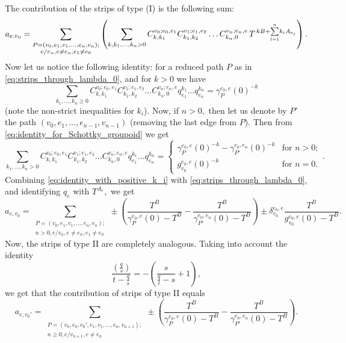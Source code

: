\documentclass[11pt,leqno]{amsart}
\numberwithin{equation}{section}
\begin{document}
The contribution of the strips of type (I) is the following sum:
\begin{equation}\label{eq:strips_through_lambda_0}a_{e,v_0}=\sum\limits_{\substack{P=(v_0,e_1,v_1,\dots,e_n,v_n);\\
e/v_n,e\ne e_n,e_1\ne e_0}}\left(\sum\limits_{k,k_1,\dots,k_n>0}C^{v_0;e_0,e_1}_{k,k_1}C^{v_1;e_1,e_2}_{k_1,k_2}\dots C^{v_n;e_n,e}_{k_n,0}\,T^{\,kB+\smash{\sum\limits_{l=1}^n} k_i A_{e_i}}\right).\end{equation}
Now let us notice the following identity: for a reduced path $P$ as in \eqref{eq:strips_through_lambda_0}, and for $k>0$ we have
\begin{equation}\label{eq:identity_for_Schottky_groupoid}
\sum\limits_{k_1,\dots,k_n\geq 0}C^{v_0;e_0,e_1}_{k,k_1}C^{v_1;e_1,e_2}_{k_1,k_2}\dots C^{v_n;e_n,e}_{k_n,0}q_{e_1}^{k_1}\dots q_{e_n}^{k_n}=\gamma_P^{e_0,e}(0)^{-k}
\end{equation}
(note the non-strict inequalities for $k_i$).
Now, if $n>0,$ then let us denote by $P'$ the path $(v_0,e_1,\dots,e_{n-1},v_{n-1})$ (removing the last edge from $P$). Then from \eqref{eq:identity_for_Schottky_groupoid} we get
\begin{equation}\label{eq:identity_with_positive_k_i}
\sum\limits_{k_1,\dots,k_n>0}C^{v_0;e_0,e_1}_{k,k_1}C^{v_1;e_1,e_2}_{k_1,k_2}\dots C^{v_n;e_n,e}_{k_n,0}q_{e_1}^{k_1}\dots q_{e_n}^{k_n}=\begin{cases}\gamma_P^{e_0,e}(0)^{-k}-\gamma_{P'}^{e_0,e_{n}}(0)^{-k} & \text{for }n>0;\\
g_{v_0}^{e_0,e}(0)^{-k} & \text{for }n=0.\end{cases}.
\end{equation} 
Combining \eqref{eq:identity_with_positive_k_i} with \eqref{eq:strips_through_lambda_0}, and identifying $q_{e}$
 with $T^{A_{e}},$ we get
\begin{equation}\label{eq:strips_through_lambda_0_final}a_{e,v_0}=\sum\limits_{\substack{P=(v_0,e_1,v_1,\dots,e_n,v_n);\\
n>0,e/v_n,e\ne e_n,e_1\ne e_0}}\pm\left(\frac{T^B}{\gamma_P^{e_0,e}(0)-T^B}-\frac{T^B}{\gamma_{P'}^{e_0,e_n}(0)-T^B}\right)\pm\delta_{v_0}^{e_0,e}\frac{T^B}{g_{v_0}^{e_0,e}(0)-T^B}.\end{equation}
Now, the strips of type II are completely analogous. Taking into account the identity $$\frac{(\frac{q}{s})}{t-\frac{q}{s}}=-\left(\frac{s}{\frac{q}{t}-s}+1\right),$$ we get that the contribution of strips of type II equals
\begin{equation}\label{eq:strips_through_lambda_0'}a_{e,v_0'}=\sum\limits_{\substack{P=(v_0,e_0,v_0',e_1,v_1,\dots,e_n,v_{n+1});\\
n\geq 0,e/v_{n+1},e\ne e_n}}\pm\left(\frac{T^B}{\gamma_P^{e_0,e}(0)-T^B}-\frac{T^B}{\gamma_{P'}^{e_0,e_n}(0)-T^B}\right).\end{equation}
\end{document}

